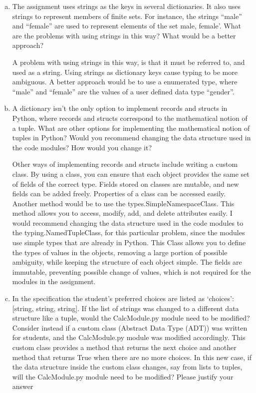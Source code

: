 \documentclass[12pt]{article}
\begin{document}
\begin{enumerate}[(a)]
\item The assignment uses strings as the keys in several dictionaries. It also uses strings to represent members of finite sets. For instance, the strings ``male'' and ``female'' are used to represent elements of the set {male, female'}. What are the problems with using strings in this way? What would be a better approach?

A problem with using strings in this way, is that it must be referred to, and used as a string. Using strings as dictionary keys cause typing to be more ambiguous. A better approach would be to use a enumerated type, where ``male'' and ``female'' are the values of a user defined data type ``gender''. 

\item A dictionary isn't the only option to implement records and structs in Python, where records and structs correspond to the mathematical notion of a tuple. What are other options for implementing the mathematical notion of tuples in Python? Would you recommend changing the data structure used in the code modules? How would you change it?

Other ways of implementing records and structs include writing a custom class. By using a class, you can ensure that each object provides the same set of fields of the correct type. Fields stored on classes are mutable, and new fields can be added freely. Properties of a class can be accessed easily. Another method would be to use the types.SimpleNamespaceClass. This method allows you to access, modify, add, and delete attributes easily. I would recommend changing the data structure used in the code modules to the typing.NamedTupleClass, for this particular problem, since the modules use simple types that are already in Python. This Class allows you to define the types of values in the objects, removing a large portion of possible ambiguity, while keeping the structure of each object simple. The fields are immutable, preventing possible change of values, which is not required for the modules in the assignment.

\item In the specification the student's preferred choices are listed as `choices': [string, string, string]. If the list of strings was changed to a different data structure like a tuple, would the CalcModule.py module need to be modified? Consider instead if a custom class (Abstract Data Type (ADT)) was written for students, and the CalcModule.py module was modified accordingly. This custom class provides a method that returns the next choice and another method that returns True when there are no more choices. In this new case, if the data structure inside the custom class changes, say from lists to tuples, will the CalcModule.py module need to be modified? Please justify your answer


\end{enumerate}
\end{document}

